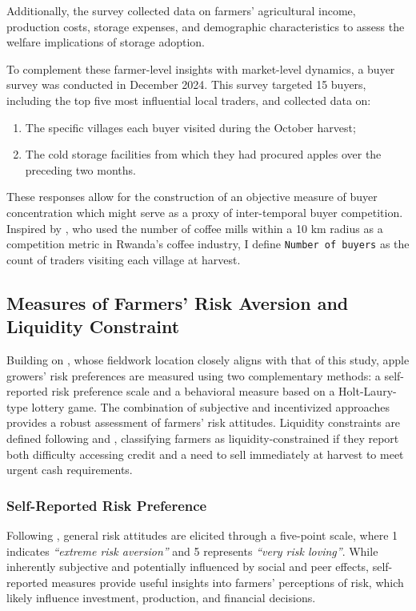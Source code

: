 Additionally, the survey collected data on farmers' agricultural income, production costs, storage expenses, and demographic characteristics to assess the welfare implications of storage adoption.  

To complement these farmer-level insights with market-level dynamics, a buyer survey was conducted in December 2024. This survey targeted 15 buyers, including the top five most influential local traders, and collected data on:
\begin{enumerate}
    \item The specific villages each buyer visited during the October harvest;
    \item The cold storage facilities from which they had procured apples over the preceding two months.
\end{enumerate}
These responses allow for the construction of an objective measure of buyer concentration which might serve as a proxy of inter-temporal buyer competition. Inspired by \cite{macchiavello2021competition}, who used the number of coffee mills within a 10 km radius as a competition metric in Rwanda’s coffee industry, I define \texttt{Number of buyers} as the count of traders visiting each village at harvest.  


\subsection{Measures of Farmers' Risk Aversion and Liquidity Constraint}
\noindent Building on \cite{jin2024losses}, whose fieldwork location closely aligns with that of this study, apple growers' risk preferences are measured using two complementary methods: a self-reported risk preference scale and a behavioral measure based on a Holt-Laury-type lottery game. The combination of subjective and incentivized approaches provides a robust assessment of farmers' risk attitudes. Liquidity constraints are defined following \cite{albuquerque2024market} and \cite{stephens2011incomplete}, classifying farmers as liquidity-constrained if they report both difficulty accessing credit and a need to sell immediately at harvest to meet urgent cash requirements.

\subsubsection{Self-Reported Risk Preference}  
\noindent Following \cite{dohmen2011individual}, general risk attitudes are elicited through a five-point scale, where 1 indicates \textit{``extreme risk aversion''} and 5 represents \textit{``very risk loving''}. While inherently subjective and potentially influenced by social and peer effects, self-reported measures provide useful insights into farmers' perceptions of risk, which likely influence investment, production, and financial decisions.  

